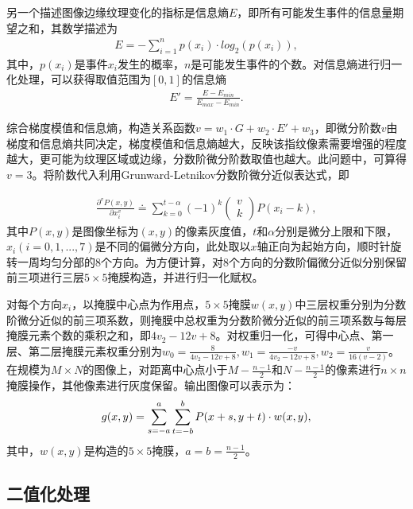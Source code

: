 \documentclass{whutmod}
\begin{document}
\begin{itemize}
另一个描述图像边缘纹理变化的指标是信息熵$E$，即所有可能发生事件的信息量期望之和，其数学描述为
\begin{gather}
	E=-\sum_{i=1}^{n}p(x_i)\cdot log_2(p(x_i)),	
\end{gather}
其中，$p(x_i)$是事件$x_i$发生的概率，$n$是可能发生事件的个数。对信息熵进行归一化处理，可以获得取值范围为$[0,1]$的信息熵
\begin{gather}
	\displaystyle E'=\frac{E-E_{min}}{E_{max}-E_{min}}.
\end{gather}

综合梯度模值和信息熵，构造关系函数$v=w_1\cdot G+w_2\cdot E'+w_3$，即微分阶数$v$由梯度和信息熵共同决定，梯度模值和信息熵越大，反映该指纹像素需要增强的程度越大，更可能为纹理区域或边缘，分数阶微分阶数取值也越大。此问题中，可算得$v=3$。将阶数代入利用Grunward-Letnikov分数阶微分近似表达式，即

\begin{gather}
	\displaystyle\frac{\partial^v P(x,y)}{\partial x_{i}^{v}}\doteq\displaystyle\sum_{k=0}^{t-\alpha}(-1)^{k}\begin{pmatrix}
		v \\ k
	\end{pmatrix}P(x_i-k), 
\end{gather}
其中$P(x,y)$是图像坐标为$(x,y)$的像素灰度值，$t$和$\alpha$分别是微分上限和下限，$x_i(i=0,1,...,7)$是不同的偏微分方向，此处取以$x$轴正向为起始方向，顺时针旋转一周均匀分部的$8$个方向。为方便计算，对$8$个方向的分数阶偏微分近似分别保留前三项进行三层$5 \times 5$掩膜构造，并进行归一化赋权。

对每个方向$x_i$，以掩膜中心点为作用点，$5\times 5$掩膜$w(x,y)$中三层权重分别为分数阶微分近似的前三项系数，则掩膜中总权重为分数阶微分近似的前三项系数与每层掩膜元素个数的乘积之和，即$4v_2-12v+8$。对权重归一化，可得中心点、第一层、第二层掩膜元素权重分别为$\displaystyle w_0=\frac{8}{4v_2-12v+8}, w_1=\frac{-v}{4v_2-12v+8}, w_2=\frac{v}{16(v-2)}$。
在规模为$M\times N$的图像上，对距离中心点小于$\displaystyle M-\frac{n-1}{2}$和$\displaystyle N-\frac{n-1}{2}$的像素进行$n\times n$掩膜操作，其他像素进行灰度保留。输出图像可以表示为：
\begin{gather}
	\displaystyle g(x,y)=\sum_{s=-a}^{a}\sum_{t=-b}^{b}P(x+s,y+t)\cdot \boldmath{w}(x,y),
\end{gather}
其中，$w(x,y)$是构造的$5\times 5$掩膜，$a=b=\displaystyle \frac{n-1}{2}$。


\subsection{二值化处理}	  	

\end{itemize}
\end{document}
